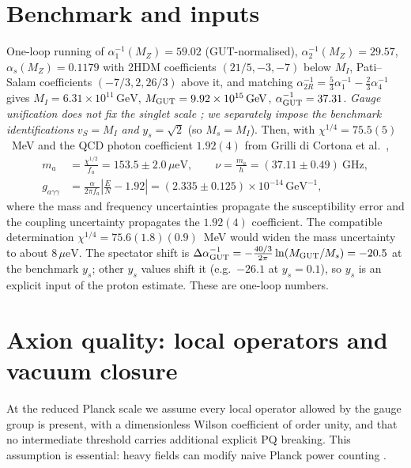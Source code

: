 \documentclass[11pt,a4paper]{article}
\newcommand{\ueV}{\,\mu\mathrm{eV}}
\newcommand{\GeV}{\,\mathrm{GeV}}
\newcommand{\fa}{f_a}
\newcommand{\ma}{m_a}
\begin{document}
\section{Benchmark and inputs}
\label{sec:bench}
One-loop running of $\alpha_1^{-1}(M_Z)=59.02$ (GUT-normalised),
$\alpha_2^{-1}(M_Z)=29.57$, $\alpha_s(M_Z)=0.1179$ with 2HDM
coefficients $(21/5,-3,-7)$ below $M_I$, Pati--Salam coefficients
$(-7/3,2,26/3)$ above it, and matching
$\alpha_{2R}^{-1} = \tfrac53\alpha_1^{-1} - \tfrac23\alpha_4^{-1}$
gives $M_I = 6.31\times10^{11}\GeV$,
$M_{\rm GUT} = 9.92\times10^{15}\GeV$,
$\alpha_{\rm GUT}^{-1} = 37.31$. \emph{Gauge unification does not fix
the singlet scale \cite{ERT}; we separately impose the benchmark
identifications} $v_S = M_I$ \emph{and} $y_s = \sqrt2$ (so
$M_s = M_I$). Then, with $\chi^{1/4} = 75.5(5)$~MeV and the QCD photon
coefficient $1.92(4)$ from Grilli di Cortona et al.\ \cite{GrillidiCortona},
\begin{align}
\ma &= \frac{\chi^{1/2}}{\fa} = 153.5 \pm 2.0\ueV,
\qquad
\nu = \frac{\ma}{h} = (37.11\pm0.49)\ \mathrm{GHz},\\
g_{a\gamma\gamma} &= \frac{\alpha}{2\pi\fa}
\left|\frac{E}{N}-1.92\right|
= (2.335\pm0.125)\times10^{-14}\GeV^{-1},
\end{align}
where the mass and frequency uncertainties propagate the susceptibility
error and the coupling uncertainty propagates the $1.92(4)$ coefficient.
The compatible determination $\chi^{1/4}=75.6(1.8)(0.9)$~MeV
\cite{Borsanyi} would widen the mass uncertainty to about $8\ueV$.
The spectator shift is
$\Delta\alpha_{\rm GUT}^{-1} = -\tfrac{40/3}{2\pi}
\ln(M_{\rm GUT}/M_s) = -20.5$ at the benchmark $y_s$; other $y_s$
values shift it (e.g.\ $-26.1$ at $y_s = 0.1$), so $y_s$ is an explicit
input of the proton estimate. These are one-loop numbers.

\section{Axion quality: local operators and vacuum closure}
\label{sec:quality}
At the reduced Planck scale we assume every local operator allowed by
the gauge group is present, with a dimensionless Wilson coefficient of
order unity, and that no intermediate threshold carries additional
explicit PQ breaking. This assumption is essential: heavy fields can
modify naive Planck power counting \cite{Bonnefoy}.
\end{document}
